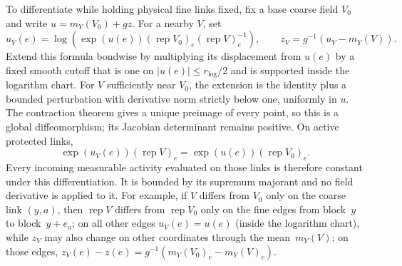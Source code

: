 To differentiate while holding physical fine links fixed, fix a base coarse field $V_0$ and write $u=m_Y(V_0)+gz$. For a nearby $V$, set
\begin{equation*}
u_V(e)=\log\left(\exp(u(e))(\operatorname{rep}V_0)_e(\operatorname{rep}V)_e^{-1}\right),\qquad
z_V=g^{-1}(u_V-m_Y(V)).
\end{equation*}
Extend this formula bondwise by multiplying its displacement from $u(e)$ by a fixed smooth cutoff that is one on $|u(e)|\le r_{\log}/2$ and is supported inside the logarithm chart. For $V$ sufficiently near $V_0$, the extension is the identity plus a bounded perturbation with derivative norm strictly below one, uniformly in $u$. The contraction theorem gives a unique preimage of every point, so this is a global diffeomorphism; its Jacobian determinant remains positive. On active protected links,
\begin{equation*}
\exp(u_V(e))(\operatorname{rep}V)_e=\exp(u(e))(\operatorname{rep}V_0)_e.
\end{equation*}
Every incoming measurable activity evaluated on those links is therefore constant under this differentiation. It is bounded by its supremum majorant and no field derivative is applied to it. For example, if $V$ differs from $V_0$ only on the coarse link $(y,a)$, then $\operatorname{rep}V$ differs from $\operatorname{rep}V_0$ only on the fine edges from block~$y$ to block~$y+e_a$; on all other edges $u_V(e)=u(e)$ (inside the logarithm chart), while $z_V$ may also change on other coordinates through the mean~$m_Y(V)$; on those edges, $z_V(e)-z(e)=g^{-1}(m_Y(V_0)_e-m_Y(V)_e)$.

